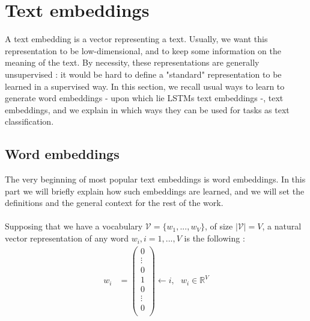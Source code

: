 \documentclass{article}
\newcommand{\R}{\mathbb R}
\begin{document}
\tableofcontents
\newpage
{}
\section{Text embeddings}

A text embedding is a vector representing a text. Usually, 
we want this representation to be low-dimensional, and to 
keep some information on the meaning of the text. By necessity, 
these representations are generally unsupervised : it would be 
hard to define a "standard" representation to be learned in a 
supervised way. In this section, we recall usual ways to 
learn to generate word embeddings - upon which lie LSTMs text embeddings -, 
text embeddings, and we explain in which ways they can be used for 
tasks as text classification.


\subsection{Word embeddings}

The very beginning of most popular
text embeddings is word embeddings. In this part
we will briefly explain how such embeddings are learned, and we will
set the definitions and the general context for the rest of the 
work. \\ \\
Supposing that we have a vocabulary 
$\mathcal{V} = \{w_1, ..., w_V \}$, of size 
$| \mathcal{V} | = V$, a natural vector representation of any word 
$w_i, i=1, ..., V$ is the following :
\begin{align*}
    w_i &= 
    \left (
    \begin{array}{c}
        0 \\
        \vdots \\
        0 \\
        1 \\
        0 \\
        \vdots \\
        0 \\
    \end{array}
    \right ) \leftarrow i,\ \ \ w_i \in \R^V
\end{align*}
\end{document}
